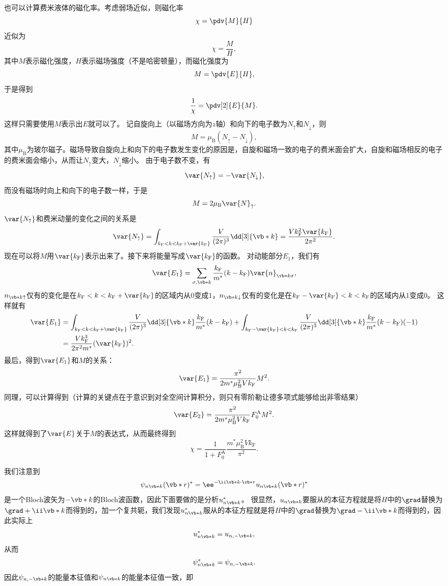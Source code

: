 也可以计算费米液体的磁化率。考虑弱场近似，则磁化率
\[
    \chi = \pdv{M}{H}
\]
近似为
\[
    \chi = \frac{M}{H},
\]
其中$M$表示磁化强度，$H$表示磁场强度（不是哈密顿量），而磁化强度为
\[
    M = \pdv{E}{H},
\]
于是得到
\[
    \frac{1}{\chi} = \pdv[2]{E}{M}.
\]
这样只需要使用$M$表示出$E$就可以了。
记自旋向上（以磁场方向为$z$轴）和向下的电子数为$N_\uparrow$和$N_\downarrow$，则
\[
    M = \mu_\text{B} (N_\uparrow - N_\downarrow),
\]
其中$\mu_\text{B}$为玻尔磁子。磁场导致自旋向上和向下的电子数发生变化的原因是，自旋和磁场一致的电子的费米面会扩大，自旋和磁场相反的电子的费米面会缩小，从而让$N_\uparrow$变大，$N_\downarrow$缩小。
由于电子数不变，有
\[
    \var{N_\uparrow} = - \var{N_\downarrow},
\]
而没有磁场时向上和向下的电子数一样，于是
\[
    M = 2 \mu_\text{B} \var{N}_\uparrow.
\]
$\var{N_\uparrow}$和费米动量的变化之间的关系是
\[
    \var{N_\uparrow} = \int_{k_\text{F} < k < k_\text{F} + \var{k_\text{F}}} \frac{V}{(2\pi)^3} \dd[3]{\vb*{k}} = \frac{V k_\text{F}^2 \var{k_\text{F}}}{2\pi^2}.
\]
现在可以将$M$用$\var{k_\text{F}}$表示出来了。接下来将能量写成$\var{k_\text{F}}$的函数。
对动能部分$E_1$，我们有
\[
    \var{E_1} = \sum_{\sigma, \vb*{k}} \frac{k_\text{F}}{m^*} (k - k_\text{F}) \var{n}_{\vb*{k} \sigma},
\]
$n_{\vb*{k} \uparrow}$仅有的变化是在$k_\text{F} < k < k_\text{F} + \var{k_\text{F}}$的区域内从$0$变成$1$，$n_{\vb*{k} \downarrow}$仅有的变化是在$k_\text{F} - \var{k_\text{F}} < k < k_\text{F}$的区域内从$1$变成$0$。
这样就有
\[
    \begin{aligned}
        \var{E_1} &= \int_{k_\text{F} < k < k_\text{F} + \var{k_\text{F}}} \frac{V}{(2\pi)^3} \dd[3]{\vb*{k}} \frac{k_\text{F}}{m^*} (k - k_\text{F}) + \int_{k_\text{F} - \var{k_\text{F}} < k < k_\text{F}} \frac{V}{(2\pi)^3} \dd[3]{\vb*{k}} \frac{k_\text{F}}{m^*} (k - k_\text{F}) (-1) \\
        &= \frac{V k_\text{F}^3}{2 \pi^2 m^*} (\var{k_\text{F}})^2.
    \end{aligned}
\]
最后，得到$\var{E_1}$和$M$的关系：
\[
    \var{E_1} = \frac{\pi^2}{2 m^* \mu_\text{B}^2 V k_\text{F}} M^2.
\]
同理，可以计算得到（计算的关键点在于意识到对全空间计算积分，则只有零阶勒让德多项式能够给出非零结果）
\[
    \var{E_2} = \frac{\pi^2}{2 m^* \mu_\text{B}^2 V k_\text{F}} F_0^\text{A} M^2.
\]
这样就得到了$\var{E}$关于$M$的表达式，从而最终得到
\begin{equation}
    \chi = \frac{1}{1 + F_0^\text{A}} \frac{m^* \mu_\text{B}^2 V k_\text{F}}{\pi^2}.
\end{equation}


我们注意到
\[
    \psi_{n \vb*{k}}(\vb*{r})^* = \ee^{- \ii \vb*{k} \cdot \vb*{r}} u_{n \vb*{k}}(\vb*{r})^*
\]
是一个Bloch波矢为$-\vb*{k}$的Bloch波函数，因此下面要做的是分析$u_{n \vb*{k}}^*$。
很显然，$u_{n \vb*{k}}$要服从的本征方程就是将$H$中的$\grad$替换为$\grad + \ii \vb*{k}$而得到的，加一个复共轭，我们发现$u_{n \vb*{k}}^*$服从的本征方程就是将$H$中的$\grad$替换为$\grad - \ii \vb*{k}$而得到的，因此实际上
\[
    u_{n \vb*{k}}^* = u_{n, - \vb*{k}},
\]
从而
\[
    \psi_{n \vb*{k}}^* = \psi_{n, - \vb*{k}}.
\]
因此$\psi_{n, -\vb*{k}}$的能量本征值和$\psi_{n \vb*{k}}$的能量本征值一致，即